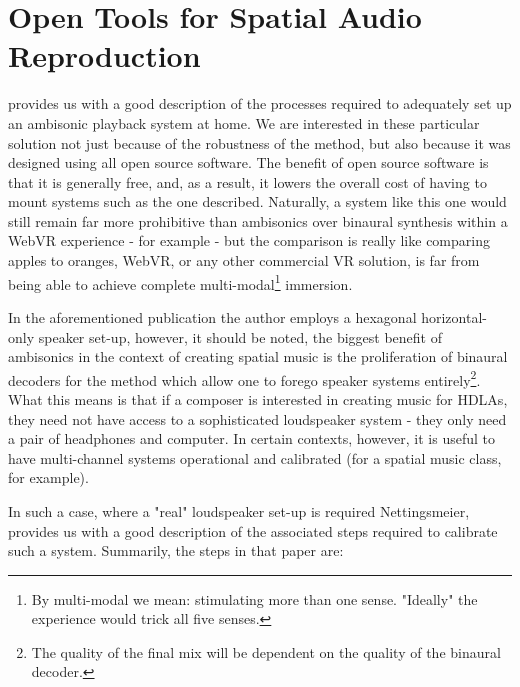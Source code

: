 
\section{Open Tools for Spatial Audio Reproduction}


\cite{nettingsmeier2008ambi} provides us with a good description of the processes required to adequately set up an ambisonic playback system at home. We are interested in these particular solution not just because of the robustness of the method, but also because it was designed using all open source software. The benefit of open source software is that it is generally free, and, as a result, it lowers the overall cost of having to mount systems such as the one described. Naturally, a system like this one would still remain far more prohibitive than ambisonics over binaural synthesis within a WebVR experience - for example - but the comparison is really like comparing apples to oranges, WebVR, or any other commercial VR solution, is far from being able to achieve complete multi-modal\footnote{By multi-modal we mean: stimulating more than one sense. "Ideally" the experience would trick all five senses.} immersion.

In the aforementioned publication the author employs a hexagonal horizontal-only speaker set-up, however, it should be noted, the biggest benefit of ambisonics in the context of creating spatial music is the proliferation of binaural decoders for the method which allow one to forego speaker systems entirely\footnote{The quality of the final mix will be dependent on the quality of the binaural decoder.}. What this means is that if a composer is interested in creating music for HDLAs, they need not have access to a sophisticated loudspeaker system - they only need a pair of headphones and computer. In certain contexts, however, it is useful to have multi-channel systems operational and calibrated (for a spatial music class, for example). 

In such a case, where a "real" loudspeaker set-up is required Nettingsmeier, provides us with a good description of the associated steps required to calibrate such a system. Summarily, the steps in that paper are:

